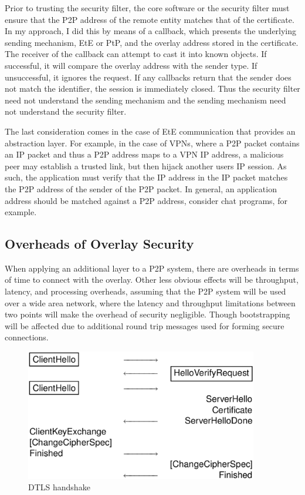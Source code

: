 Prior to trusting the security filter, the core software or the security filter
must ensure that the P2P address of the remote entity matches that of the
certificate.  In my approach, I did this by means of a callback, which presents
the underlying sending mechanism, EtE or PtP, and the overlay address stored in
the certificate.  The receiver of the callback can attempt to cast it into
known objects. If successful, it will compare the overlay address with the
sender type.  If unsuccessful, it ignores the request.  If any callbacks return
that the sender does not match the identifier, the session is immediately
closed.  Thus the security filter need not understand the sending mechanism and
the sending mechanism need not understand the security filter.

The last consideration comes in the case of EtE communication that provides an
abstraction layer.  For example, in the case of VPNs, where a P2P packet
contains an IP packet and thus a P2P address maps to a VPN IP address, a
malicious peer may establish a trusted link, but then hijack another users IP
session.  As such, the application must verify that the IP address in the IP
packet matches the P2P address of the sender of the P2P packet.  In general, an
application address should be matched against a P2P address, consider chat
programs, for example.

\subsection{Overheads of Overlay Security}

When applying an additional layer to a P2P system, there are overheads in terms
of time to connect with the overlay.  Other less obvious effects will be
throughput, latency, and processing overheads, assuming that the P2P system
will be used over a wide area network, where the latency and throughput
limitations between two points will make the overhead of security negligible.
Though bootstrapping will be affected due to additional round trip messages
used for forming secure connections.

\begin{figure}[ht]
\centering
\includegraphics[width=4in]{figs/dtls.eps}
\caption[DTLS handshake]{DTLS handshake}
\label{fig:dtls}
\end{figure}


